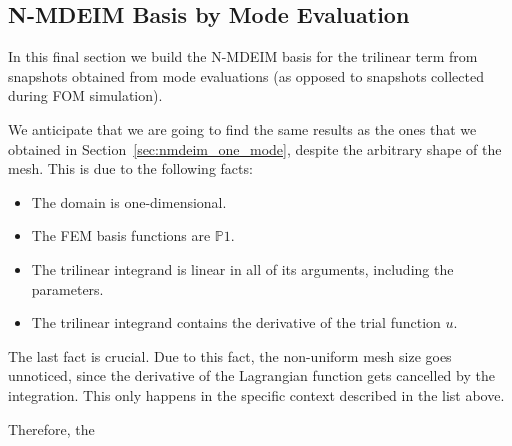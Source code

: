 \documentclass[../../thesis.tex]{subfiles}
\begin{document}
\clearpage
\subsection{N-MDEIM Basis by Mode Evaluation}
In this final section we build the N-MDEIM basis for the trilinear term
from snapshots obtained from mode evaluations 
(as opposed to snapshots collected during FOM simulation).

We anticipate that we are going to find the same results as the ones that we obtained in
Section~\ref{sec:nmdeim_one_mode}, despite the arbitrary shape of the mesh.
This is due to the following facts:
\begin{itemize}
    \item The domain is one-dimensional.
    \item The FEM basis functions are $\mathbb{P}1$.
    \item The trilinear integrand is linear in all of its arguments, including the parameters.
    \item The trilinear integrand contains the derivative of the trial function $u$.
\end{itemize}
The last fact is crucial. 
Due to this fact, the non-uniform mesh size goes unnoticed, 
since the derivative of the Lagrangian function gets cancelled by the integration.
This only happens in the specific context described in the list above.

Therefore, the 
\end{document}
